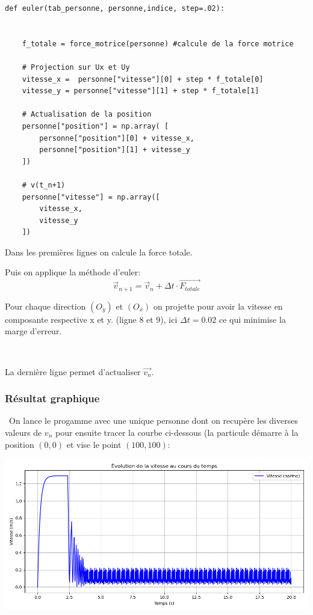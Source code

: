 \documentclass[a4paper,12pt]{article}
\begin{document}
\begin{verbatim}
def euler(tab_personne, personne,indice, step=.02):

    
    f_totale = force_motrice(personne) #calcule de la force motrice

    # Projection sur Ux et Uy
    vitesse_x =  personne["vitesse"][0] + step * f_totale[0]
    vitesse_y = personne["vitesse"][1] + step * f_totale[1]
    
    # Actualisation de la position
    personne["position"] = np.array( [
        personne["position"][0] + vitesse_x,
        personne["position"][1] + vitesse_y 
    ])

    # v(t_n+1)
    personne["vitesse"] = np.array([
        vitesse_x,
        vitesse_y
    ])
\end{verbatim}

\noindent Dans les premières lignes on calcule la force totale.

\noindent Puis on applique la méthode d'euler:
\begin{equation}
    \vec{v}_{n+1} = \vec{v}_n + \Delta t \cdot \vec{F_{totale}}
\end{equation}

\noindent Pour chaque direction $(O_y)$ et $(O_x)$ on projette pour avoir la vitesse en composante respective x et y. (ligne 8 et 9), ici $\Delta t = 0.02$ ce qui minimise la marge d'erreur.

\

\noindent La dernière ligne permet d'actualiser $\vec{v_n}$.

\subsubsection{Résultat graphique}
\
On lance le progamme avec une unique personne dont on recupère les diverses valeurs de $v_n$ pour ensuite tracer la courbe ci-dessous (la particule démarre à la position $(0,0)$ et vise le point $(100,100)$:


\includegraphics[width=\textwidth]{graph_vitesse.png} %
\end{document}
